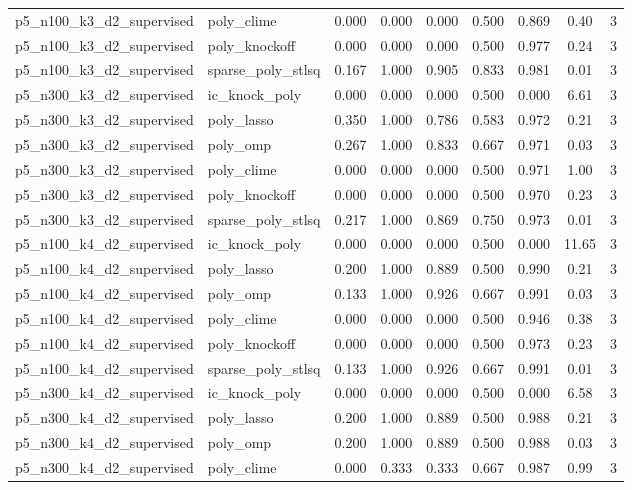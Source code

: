 \documentclass[12pt,a4paper]{article}
\begin{document}
\begin{table}[htbp]
{\begin{tabular}{llccccccc}
  p5\_n100\_k3\_d2\_supervised & poly\_clime & 0.000 & 0.000 & 0.000 & 0.500 & 0.869 & 0.40 & 3 \\
  p5\_n100\_k3\_d2\_supervised & poly\_knockoff & 0.000 & 0.000 & 0.000 & 0.500 & 0.977 & 0.24 & 3 \\
  p5\_n100\_k3\_d2\_supervised & sparse\_poly\_stlsq & 0.167 & 1.000 & 0.905 & 0.833 & 0.981 & 0.01 & 3 \\
  p5\_n300\_k3\_d2\_supervised & ic\_knock\_poly & 0.000 & 0.000 & 0.000 & 0.500 & 0.000 & 6.61 & 3 \\
  p5\_n300\_k3\_d2\_supervised & poly\_lasso & 0.350 & 1.000 & 0.786 & 0.583 & 0.972 & 0.21 & 3 \\
  p5\_n300\_k3\_d2\_supervised & poly\_omp & 0.267 & 1.000 & 0.833 & 0.667 & 0.971 & 0.03 & 3 \\
  p5\_n300\_k3\_d2\_supervised & poly\_clime & 0.000 & 0.000 & 0.000 & 0.500 & 0.971 & 1.00 & 3 \\
  p5\_n300\_k3\_d2\_supervised & poly\_knockoff & 0.000 & 0.000 & 0.000 & 0.500 & 0.970 & 0.23 & 3 \\
  p5\_n300\_k3\_d2\_supervised & sparse\_poly\_stlsq & 0.217 & 1.000 & 0.869 & 0.750 & 0.973 & 0.01 & 3 \\
  p5\_n100\_k4\_d2\_supervised & ic\_knock\_poly & 0.000 & 0.000 & 0.000 & 0.500 & 0.000 & 11.65 & 3 \\
  p5\_n100\_k4\_d2\_supervised & poly\_lasso & 0.200 & 1.000 & 0.889 & 0.500 & 0.990 & 0.21 & 3 \\
  p5\_n100\_k4\_d2\_supervised & poly\_omp & 0.133 & 1.000 & 0.926 & 0.667 & 0.991 & 0.03 & 3 \\
  p5\_n100\_k4\_d2\_supervised & poly\_clime & 0.000 & 0.000 & 0.000 & 0.500 & 0.946 & 0.38 & 3 \\
  p5\_n100\_k4\_d2\_supervised & poly\_knockoff & 0.000 & 0.000 & 0.000 & 0.500 & 0.973 & 0.23 & 3 \\
  p5\_n100\_k4\_d2\_supervised & sparse\_poly\_stlsq & 0.133 & 1.000 & 0.926 & 0.667 & 0.991 & 0.01 & 3 \\
  p5\_n300\_k4\_d2\_supervised & ic\_knock\_poly & 0.000 & 0.000 & 0.000 & 0.500 & 0.000 & 6.58 & 3 \\
  p5\_n300\_k4\_d2\_supervised & poly\_lasso & 0.200 & 1.000 & 0.889 & 0.500 & 0.988 & 0.21 & 3 \\
  p5\_n300\_k4\_d2\_supervised & poly\_omp & 0.200 & 1.000 & 0.889 & 0.500 & 0.988 & 0.03 & 3 \\
  p5\_n300\_k4\_d2\_supervised & poly\_clime & 0.000 & 0.333 & 0.333 & 0.667 & 0.987 & 0.99 & 3 \\

\end{tabular}}
\end{table}
\end{document}
